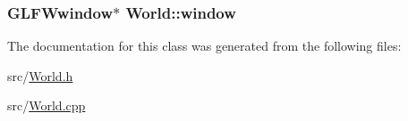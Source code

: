\subsubsection[{\texorpdfstring{window}{window}}]{\setlength{\rightskip}{0pt plus 5cm}G\+L\+F\+Wwindow$\ast$ World\+::window\hspace{0.3cm}{\ttfamily [protected]}}\hypertarget{class_world_a948668ffc237256daba819fd35c5ab68}{}\label{class_world_a948668ffc237256daba819fd35c5ab68}


The documentation for this class was generated from the following files\+:\begin{DoxyCompactItemize}
\item 
src/\hyperlink{_world_8h}{World.\+h}\item 
src/\hyperlink{_world_8cpp}{World.\+cpp}\end{DoxyCompactItemize}
